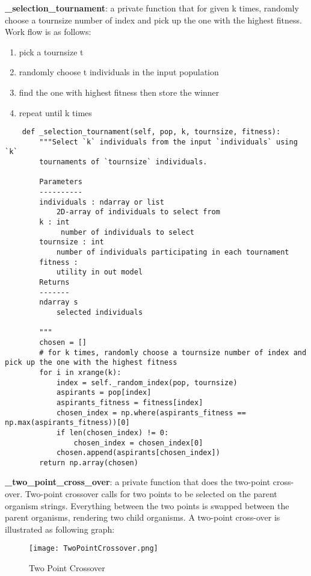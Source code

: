\documentclass[12pt]{article}
\begin{document}
\textbf{\_selection\_tournament}: a private function that for given k times, randomly choose a tournsize number of index and pick up the one with the highest fitness.
Work flow is as follows:
\begin{enumerate}
  \item pick a tournsize t
  \item randomly choose t individuals in the input population
  \item find the one with highest fitness then store the winner
  \item repeat until k times
\end{enumerate}
\begin{verbatim}
	def _selection_tournament(self, pop, k, tournsize, fitness):
	    """Select `k` individuals from the input `individuals` using `k`
	    tournaments of `tournsize` individuals.
	
	    Parameters
	    ----------
	    individuals : ndarray or list
	    	2D-array of individuals to select from
	    k : int
	    	 number of individuals to select
	    tournsize : int
	    	number of individuals participating in each tournament
	   	fitness :
	   		utility in out model
	   	Returns
	   	-------
	   	ndarray s
	   		selected individuals
	
	    """
	    chosen = []
	    # for k times, randomly choose a tournsize number of index and pick up the one with the highest fitness
	    for i in xrange(k):
	        index = self._random_index(pop, tournsize)
	        aspirants = pop[index]
	        aspirants_fitness = fitness[index]
	        chosen_index = np.where(aspirants_fitness == np.max(aspirants_fitness))[0]
	        if len(chosen_index) != 0:
	        	chosen_index = chosen_index[0]
	        chosen.append(aspirants[chosen_index])
	    return np.array(chosen)
\end{verbatim}
\textbf{\_two\_point\_cross\_over}: a private function that does the two-point cross-over. Two-point crossover calls for two points to be selected on the parent organism strings. Everything between the two points is swapped between the parent organisms, rendering two child organisms. A two-point cross-over is illustrated as following graph:
\begin{figure}[H]
    \centering
    \texttt{[image: TwoPointCrossover.png]}
    \caption{Two Point Crossover}
    \label{fig:twopointcrossover}
\end{figure}
\end{document}
